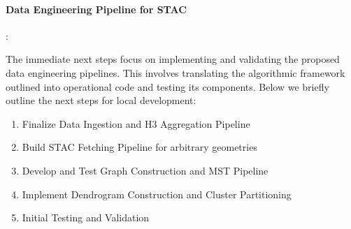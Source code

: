 \paragraph{Data Engineering Pipeline for STAC}: 

The immediate next steps focus on implementing and validating the proposed data engineering pipelines. This involves translating the algorithmic framework outlined into operational code and testing its components. 
Below we briefly outline the next steps for local development: 

\begin{enumerate}
    \item Finalize Data Ingestion and H3 Aggregation Pipeline
    \item Build STAC Fetching Pipeline for arbitrary geometries
    \item Develop and Test Graph Construction and MST Pipeline
    \item Implement Dendrogram Construction and Cluster Partitioning
    \item Initial Testing and Validation
\end{enumerate}